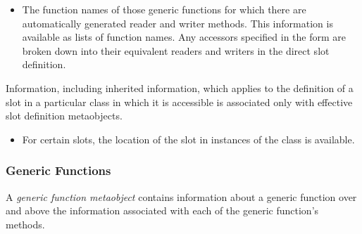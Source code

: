   \begin{itemize}
  \item 
    The function names of those generic functions for which there are
    automatically generated reader and writer methods. This information is
    available as lists of function names. Any accessors specified in the
     form are broken down into their equivalent readers and writers in
    the direct slot definition.
  \end{itemize}


Information, including inherited information, which applies to the definition of
a slot in a particular class in which it is accessible is associated only with
effective slot definition metaobjects. 


  \begin{itemize}
  \item 
    For certain slots, the location of the slot in instances of the class is
    available.
  \end{itemize}


\subsubsection{Generic Functions}

A \emph{generic function metaobject} contains information about a generic function over
and above the information associated with each of the generic function's
methods. 


